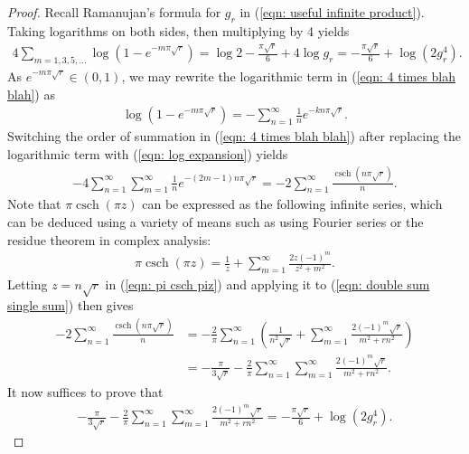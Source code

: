 \documentclass[11pt]{amsart}
\theoremstyle{definition}
\numberwithin{theorem}{section}
\begin{document}
\begin{proof}
Recall Ramanujan's formula for $g_r$ in (\ref{eqn: useful infinite product}). Taking logarithms on both sides, then multiplying by 4 yields  \begin{align}\label{eqn: 4 times blah blah}
    4\sum_{m=1,3,5,\ldots}\operatorname{log}\left(1-e^{-m\pi \sqrt{r}}\right)=\operatorname{log}2-\frac{\pi\sqrt{r}}{6}+4\operatorname{log} g_r = -\frac{\pi\sqrt{r}}{6} +\log\left(2g_r^4\right) .
\end{align}
As $e^{-m\pi \sqrt{r}}\in \left(0,1\right)$, we may rewrite the logarithmic term in (\ref{eqn: 4 times blah blah}) as
\begin{align}\label{eqn: log expansion}
    \operatorname{log}\left(1-e^{-m\pi \sqrt{r}}\right) = -\sum_{n=1}^{\infty} \frac{1}{n} e^{-k n \pi \sqrt{r}}.
\end{align}
Switching the order of summation in (\ref{eqn: 4 times blah blah}) after replacing the logarithmic term with (\ref{eqn: log expansion}) yields
\begin{align}\label{eqn: double sum single sum}
    -4\sum_{n=1}^\infty \sum_{m=1}^\infty \frac{1}{n} e^{-(2m-1)n \pi \sqrt{r}} = -2\sum_{n=1}^\infty \frac{\operatorname{csch}(n\pi \sqrt{r})}{n}.
\end{align}
Note that $\pi \operatorname{csch}\left(\pi z\right)$ can be expressed as the following infinite series, which can be deduced using a variety of means such as using Fourier series or the residue theorem in complex analysis: \begin{align}\label{eqn: pi csch piz}
    \pi \operatorname{csch}\left(\pi z\right)= \frac{1}{z}+\sum_{m=1}^{\infty}\frac{2z\left(-1\right)^m}{z^2+m^2}.
\end{align}
Letting $z=n\sqrt{r}$ in (\ref{eqn: pi csch piz}) and applying it to (\ref{eqn: double sum single sum}) then gives
\begin{align*}
    -2\sum_{n=1}^\infty \frac{\operatorname{csch}(n\pi \sqrt{r})}{n} &= -\frac{2}{\pi}\sum_{n=1}^\infty \left( \frac{1}{n^2 \sqrt{r}} + \sum_{m=1}^\infty \frac{2(-1)^m\sqrt{r}}{m^2+rn^2} \right)\\&= -\frac{\pi}{3\sqrt{r}} - \frac{2}{\pi} \sum_{n=1}^\infty\sum_{m=1}^\infty \frac{2(-1)^m\sqrt{r}}{m^2+rn^2}.
\end{align*}
It now suffices to prove that
\begin{align}
\label{ultima}
    -\frac{\pi}{3\sqrt{r}} - \frac{2}{\pi} \sum_{n=1}^\infty\sum_{m=1}^\infty \frac{2(-1)^m\sqrt{r}}{m^2+rn^2} = -\frac{\pi\sqrt{r}}{6} +\log(2g_r^4) .

\end{align}
\end{proof}
\end{document}
